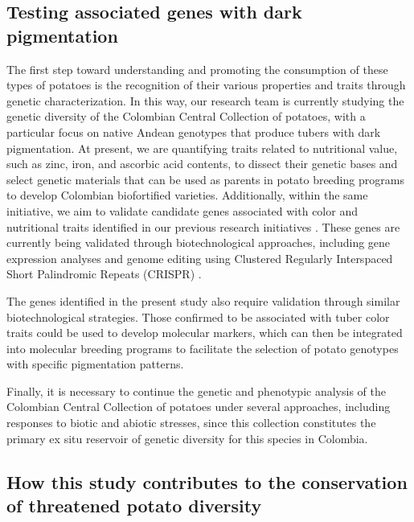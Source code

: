 \documentclass[pdflatex,sn-mathphys-ay]{sn-jnl}%
\begin{document}
\subsection{Testing associated genes with dark pigmentation}


The first step toward understanding and promoting the consumption of these types of potatoes is the recognition of their various properties and traits through genetic characterization. In this way, our research team is currently studying the genetic diversity of the Colombian Central Collection of potatoes, with a particular focus on native Andean genotypes that produce tubers with dark pigmentation. At present, we are quantifying traits related to nutritional value, such as zinc, iron, and ascorbic acid contents, to dissect their genetic bases and select genetic materials that can be used as parents in potato breeding programs to develop Colombian biofortified varieties. Additionally, within the same initiative, we aim to validate candidate genes associated with color and nutritional traits identified in our previous research initiatives \citep{berdugo2023phenotypic,Berdugo2017}. These genes are currently being validated through biotechnological approaches, including gene expression analyses and genome editing using Clustered Regularly Interspaced Short Palindromic Repeats (CRISPR)  \citep{Berdugo2024}.

The genes identified in the present study also require validation through similar biotechnological strategies. Those confirmed to be associated with tuber color traits could be used to develop molecular markers, which can then be integrated into molecular breeding programs to facilitate the selection of potato genotypes with specific pigmentation patterns.

Finally, it is necessary to continue the genetic and phenotypic analysis of the Colombian Central Collection of potatoes under several approaches, including responses to biotic and abiotic stresses, since this collection constitutes the primary ex situ reservoir of genetic diversity for this species in Colombia.


\subsection{How this study contributes to the conservation of threatened potato diversity}
\end{document}
